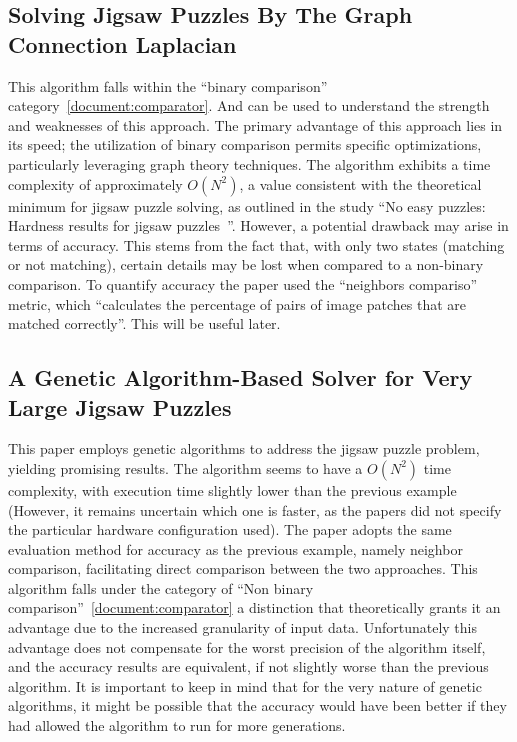 \documentclass{article}
\begin{document}
\subsection{Solving Jigsaw Puzzles By The Graph Connection Laplacian~\cite{GCL}}
This algorithm falls within the ``binary comparison'' category~\ref{document:comparator}.
And can be used to understand the strength and weaknesses
of this approach.\newline
The primary advantage of this approach lies in its speed;
the utilization of binary comparison permits specific optimizations,
particularly leveraging graph theory techniques.\newline
The algorithm exhibits a time complexity of approximately \(O(N^2)\),
a value consistent with the theoretical minimum for
jigsaw puzzle solving, as outlined in the study
``No easy puzzles: Hardness results for jigsaw puzzles~\cite{ON2Claim}''.\newline
However, a potential drawback may arise in terms of accuracy.
This stems from the fact that, with only two states
(matching or not matching),
certain details may be lost when compared to a non-binary comparison. 
To quantify accuracy the paper used the ``neighbors compariso'' metric,
which ``calculates the percentage of pairs of image patches that are matched correctly''.
This will be useful later.\label{document:GCL}

\subsection{A Genetic Algorithm-Based Solver for Very Large Jigsaw Puzzles~\cite{GA}}
This paper employs genetic algorithms to address the
jigsaw puzzle problem, yielding promising results.\newline
The algorithm seems to have a \(O(N^2)\) time complexity,
with execution time slightly lower than the previous example
(However, it remains uncertain which one is faster, as the papers did not specify
the particular hardware configuration used).\newline
The paper adopts the same evaluation method for accuracy as the previous example,
namely neighbor comparison, facilitating direct comparison between the two approaches.
This algorithm falls under the category of “Non binary comparison”~\ref{document:comparator}
a distinction that theoretically grants it an advantage due to the increased granularity
of input data.
Unfortunately this advantage does not compensate for the worst precision
of the algorithm itself, and the accuracy results are equivalent,
if not slightly worse than the previous algorithm.\newline
It is important to keep in mind that for the very nature of genetic algorithms,
it might be possible that the accuracy would have been better if they had allowed
the algorithm to run for more generations.\label{document:GA}
\end{document}
